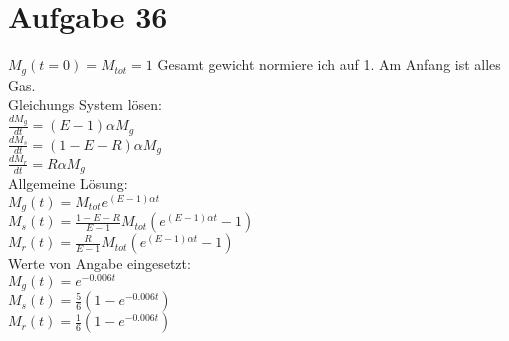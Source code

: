 \section{Aufgabe 36}

$M_g(t=0) = M_{tot} = 1$ Gesamt gewicht normiere ich auf 1. Am Anfang ist alles Gas.\\
Gleichungs System lösen:\\
$\frac{dM_g}{dt} = (E - 1) \alpha M_g$\\
$\frac{dM_s}{dt} = (1 - E - R) \alpha M_g$\\
$\frac{dM_r}{dt} = R \alpha M_g$\\

Allgemeine Lösung:\\
$M_g(t) = M_{tot} e^{(E - 1)\alpha t}$\\
$M_s(t) = \frac{1 - E - R}{E - 1}M_{tot}(e^{(E - 1)\alpha t} - 1)$\\
$M_r(t) = \frac{R}{E -1}M_{tot}(e^{(E - 1)\alpha t} - 1)$\\



Werte von Angabe eingesetzt:\\
$M_g(t) = e^{-0.006t}$\\
$M_s(t) = \frac{5}{6}(1 - e^{-0.006t})$\\
$M_r(t) = \frac{1}{6}(1 - e^{-0.006t})$\\


